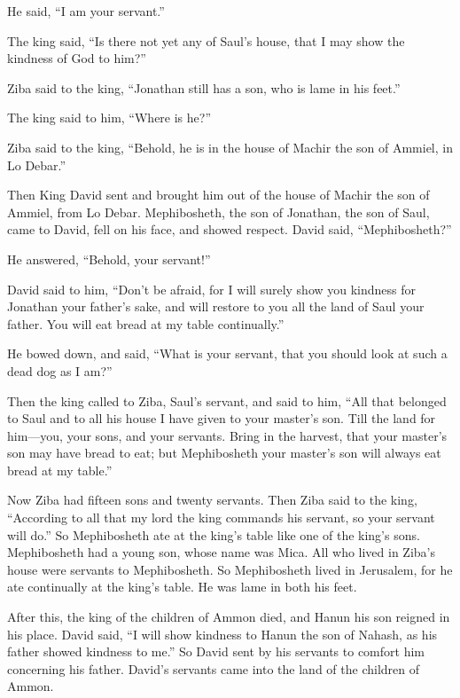 He said, “I am your servant.”

\myverse{}The king said, “Is there not yet any of Saul’s house, that I may
show the kindness of God to him?”

Ziba said to the king, “Jonathan still has a son, who is lame in his feet.”

\myverse{}The king said to him, “Where is he?”

Ziba said to the king, “Behold, he is in the house of Machir the son of Ammiel, in Lo Debar.”

\myverse{}Then King David sent and brought him out of the house of Machir
the son of Ammiel, from Lo Debar.
\myverse{}Mephibosheth, the son of Jonathan, the son of Saul, came to David, fell on his
face, and showed respect. David said, “Mephibosheth?”

He answered, “Behold, your servant!”

\myverse{}David said to him, “Don’t be afraid, for I will surely show you
kindness for Jonathan your father’s sake, and will restore to you all the land of Saul your father. You
will eat bread at my table continually.”

\myverse{}He bowed down, and said, “What is your servant, that you should
look at such a dead dog as I am?”

\myverse{}Then the king called to Ziba, Saul’s servant, and said to him,
“All that belonged to Saul and to all his house I have given to your master’s son.
\myverse{}Till the land for him—you, your sons, and your servants. Bring in the harvest,
that your master’s son may have bread to eat; but Mephibosheth your master’s son will always eat bread
at my table.”

Now Ziba had fifteen sons and twenty servants.
\myverse{}Then Ziba said to the king, “According to all that my lord the king commands
his servant, so your servant will do.” So Mephibosheth ate at the king’s table like one of the king’s
sons.
\myverse{}Mephibosheth had a young son, whose name was Mica. All who lived in Ziba’s
house were servants to Mephibosheth.
\myverse{}So Mephibosheth lived in Jerusalem, for he ate continually at the king’s table.
He was lame in both his feet.


\mychapter{} \myverse*{}After this, the king of the children of Ammon died, and Hanun
his son reigned in his place.
\myverse{}David said, “I will show kindness to Hanun the son of Nahash, as his father
showed kindness to me.” So David sent by his servants to comfort him concerning his father. David’s servants
came into the land of the children of Ammon.

